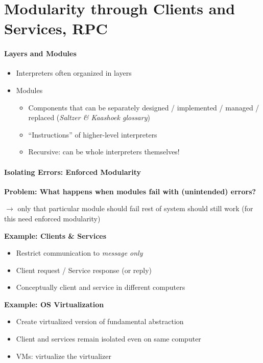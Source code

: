 \section{Modularity through Clients and Services, RPC}

\paragraph{Layers and Modules}
\begin{itemize}
\item Interpreters often organized in layers
\item Modules
  \begin{itemize}
  \item Components that can be separately designed / implemented
    / managed / replaced (\textit{Saltzer \& Kaashoek glossary})
  \item ``Instructions'' of higher-level interpreters
  \item Recursive: can be whole interpreters themselves!
  \end{itemize}
\end{itemize}


\paragraph{Isolating Errors: Enforced Modularity}
\textbf{Problem: What happens when modules fail
  with (unintended) errors?}

$\rightarrow$ only that particular module should fail rest of system
should still work (for this need enforced modularity)

\textbf{Example: Clients \& Services}
\begin{itemize}
\item Restrict communication to \textit{message only}
\item Client request / Service response (or reply)
\item Conceptually client and service in different computers
\end{itemize}

\textbf{Example: OS Virtualization}
\begin{itemize}
\item Create virtualized version of fundamental abstraction
\item Client and services remain isolated even on same computer
\item VMs: virtualize the virtualizer
\end{itemize}

